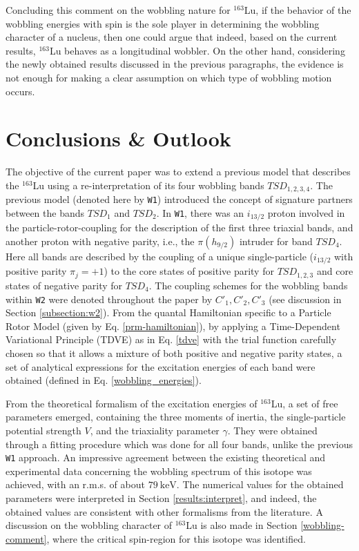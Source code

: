 \documentclass[myclassdoc,debug]{rjparticle}
\begin{document}
Concluding this comment on the wobbling nature for $^{163}$Lu, if the behavior of the wobbling energies with spin is the sole player in determining the wobbling character of a nucleus, then one could argue that indeed, based on the current results, $^{163}$Lu behaves as a longitudinal wobbler. On the other hand, considering the newly obtained results discussed in the previous paragraphs, the evidence is not enough for making a clear assumption on which type of wobbling motion occurs.
\section{Conclusions \& Outlook}
\label{section-gata}

The objective of the current paper was to extend a previous model that describes the $^{163}$Lu using a re-interpretation of its four wobbling bands $TSD_{1,2,3,4}$. The previous model (denoted here by \texttt{W1}) introduced the concept of signature partners between the bands $TSD_1$ and $TSD_2$. In \texttt{W1}, there was an $i_{13/2}$ proton involved in the particle-rotor-coupling for the description of the first three triaxial bands, and another proton with negative parity, i.e., the $\pi(h_{9/2})$ intruder for band $TSD_4$. Here all bands are described by the coupling of a unique single-particle ($i_{13/2}$ with positive parity $\pi_{j}=+1$) to the core states of positive parity for $TSD_{1,2,3}$ and core states of negative parity for $TSD_4$. The coupling schemes for the wobbling bands within \texttt{W2} were denoted throughout the paper by $C'_1, C'_2, C'_3$ (see discussion in Section \ref{subsection:w2}). From the quantal Hamiltonian specific to a Particle Rotor Model (given by Eq. \ref{prm-hamiltonian}), by applying a Time-Dependent Variational Principle (TDVE) as in Eq. \ref{tdve} with the trial function carefully chosen so that it allows a mixture of both positive and negative parity states, a set of analytical expressions for the excitation energies of each band were obtained (defined in Eq. \ref{wobbling_energies}).

From the theoretical formalism of the excitation energies of $^{163}$Lu, a set of free parameters emerged, containing the three moments of inertia, the single-particle potential strength $V$, and the triaxiality parameter $\gamma$. They were obtained through a fitting procedure which was done for all four bands, unlike the previous \texttt{W1} approach. An impressive agreement between the existing theoretical and experimental data concerning the wobbling spectrum of this isotope was achieved, with an r.m.s. of about $79\ \text{keV}$. The numerical values for the obtained parameters were interpreted in Section \ref{results:interpret}, and indeed, the obtained values are consistent with other formalisms from the literature. A discussion on the wobbling character of $^{163}$Lu is also made in Section \ref{wobbling-comment}, where the critical spin-region for this isotope was identified.
\end{document}
